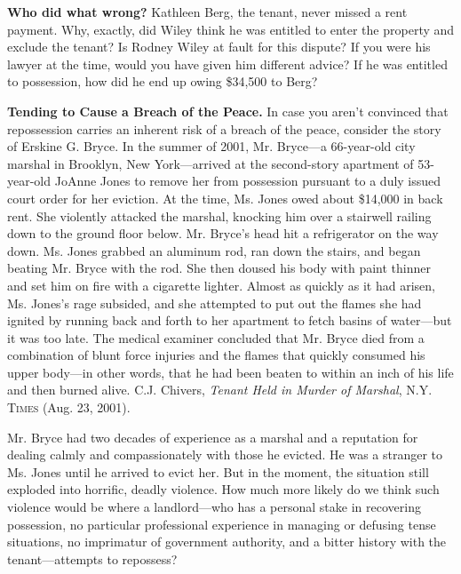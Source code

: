 
\item \textbf{Who did what wrong?} Kathleen Berg, the tenant, never missed a
rent payment.  Why, exactly, did Wiley think he was entitled to enter the
property and exclude the tenant?  Is Rodney Wiley at fault for this dispute? 
If you were his lawyer at the time, would you have given him different advice? 
If he was entitled to possession, how did he end up owing \$34,500 to Berg?


\item \textbf{Tending to Cause a Breach of the Peace.} In case you aren't
convinced that repossession carries an inherent risk of a breach of the peace,
consider the story of Erskine G. Bryce. In the summer of 2001, Mr. Bryce---a
66-year-old city marshal in Brooklyn, New York---arrived at the second-story
apartment of 53-year-old JoAnne Jones to remove her from possession pursuant to
a duly issued court order for her eviction. At the time, Ms. Jones owed about
\$14,000 in back rent. She violently attacked the marshal, knocking him over a
stairwell railing down to the ground floor below. Mr. Bryce's head hit a
refrigerator on the way down. Ms. Jones grabbed an aluminum rod, ran down the
stairs, and began beating Mr. Bryce with the rod. She then doused his body with
paint thinner and set him on fire with a cigarette lighter. Almost as quickly
as it had arisen, Ms. Jones's rage subsided, and she attempted to put out the
flames she had ignited by running back and forth to her apartment to fetch
basins of water---but it was too late. The medical examiner concluded that Mr.
Bryce died from a combination of blunt force injuries and the flames that
quickly consumed his upper body---in other words, that he had been beaten to
within an inch of his life and then burned alive. C.J. Chivers, \textit{Tenant
Held in Murder of Marshal}, \textsc{N.Y. Times} (Aug. 23, 2001).


\item Mr. Bryce had two decades of experience as a marshal and a reputation for
dealing calmly and compassionately with those he evicted. He was a stranger to
Ms. Jones until he arrived to evict her. But in the moment, the situation still
exploded into horrific, deadly violence. How much more likely do we think such
violence would be where a landlord---who has a personal stake in recovering
possession, no particular professional experience in managing or defusing tense
situations, no imprimatur of government authority, and a bitter history with
the tenant---attempts to repossess?  


